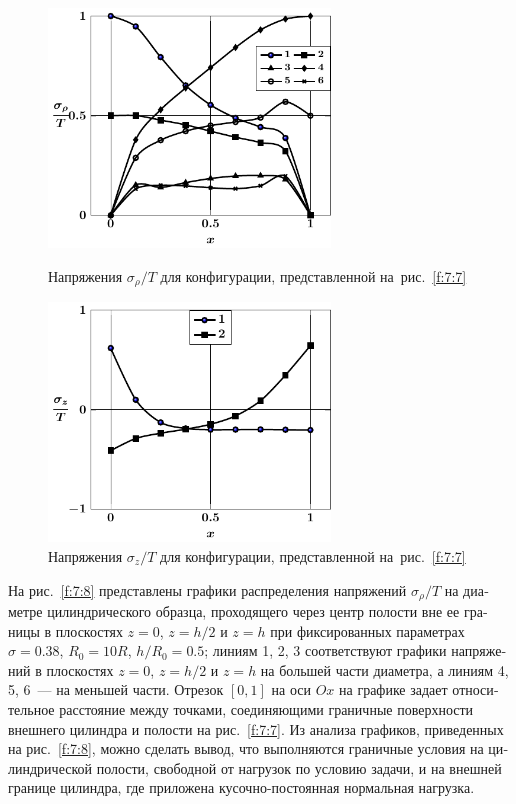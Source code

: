 \begin{russian}
\begin{figure}
\centering\footnotesize
\parbox[b]{7.5cm}{\centering\includegraphics[width=7.5cm]{image-1.pdf}
\caption{Напряжения $\sigma_\rho/T$ для конфигурации, представленной на~рис.~\ref{f:7:7}
\label{f:7:8}}}\hfil\hfil
\parbox[b]{7.5cm}{\centering\includegraphics[width=7.5cm]{image-1-z.pdf}
\caption{Напряжения $\sigma_z/T$ для конфигурации, представленной на~рис.~\ref{f:7:7}
\label{f:7:9}}}
\end{figure}

На рис.~\ref{f:7:8} представлены графики распределения напряжений $\sigma_\rho/T$ на диаметре цилиндрического образца, проходящего через центр полости вне ее границы в плоскостях $z=0$, $z=h/2$ и $z=h$ при фиксированных параметрах $\sigma=0.38$, $R_0=10R$, $h/R_0=0.5$; линиям 1, 2, 3 соответствуют графики напряжений в плоскостях $z=0$, $z=h/2$ и $z=h$ на большей части диаметра, а линиям 4, 5, 6~--- на меньшей части. Отрезок $[0,1]$ на оси $Ox$ на графике задает относительное расстояние между точками, соединяющими граничные поверхности внешнего цилиндра и полости на рис.~\ref{f:7:7}. Из анализа графиков, приведенных на рис.~\ref{f:7:8}, можно сделать вывод, что выполняются граничные условия на цилиндрической полости, свободной от нагрузок по условию задачи, и на внешней границе цилиндра, где приложена кусочно-постоянная нормальная нагрузка.


\end{russian}
